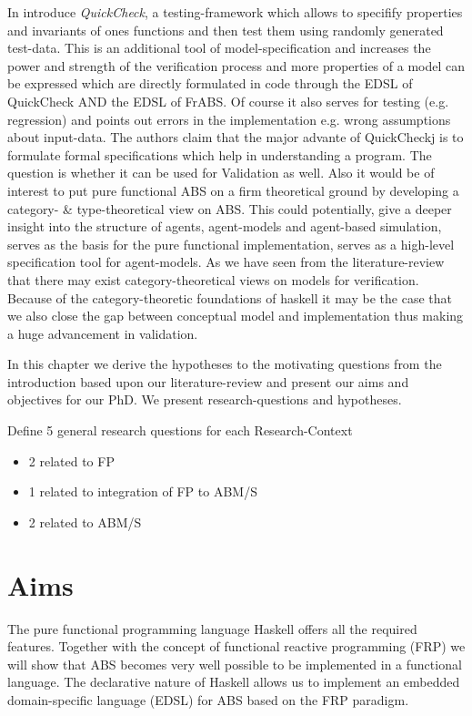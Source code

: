 In \cite{claessen_quickcheck:_2000} introduce \textit{QuickCheck}, a testing-framework which allows to specifify properties and invariants of ones functions and then test them using randomly generated test-data. This is an additional tool of model-specification and increases the power and strength of the verification process and more properties of a model can be expressed which are directly formulated in code through the EDSL of QuickCheck AND the EDSL of FrABS. Of course it also serves for testing (e.g. regression) and points out errors in the implementation e.g. wrong assumptions about input-data. The authors claim that the major advante of QuickCheckj is to formulate formal specifications which help in understanding a program. The question is whether it can be used for Validation as well.
Also it would be of interest to put pure functional ABS on a firm theoretical ground by developing a category- \& type-theoretical view on ABS. This could potentially, give a deeper insight into the structure of agents, agent-models and agent-based simulation, serves as the basis for the pure functional implementation, serves as a high-level specification tool for agent-models.
As we have seen from the literature-review that there may exist category-theoretical views on models for verification. Because of the category-theoretic foundations of haskell it may be the case that we also close the gap between conceptual model and implementation thus making a huge advancement in validation.




In this chapter we derive the hypotheses to the motivating questions from the introduction based upon our literature-review and present our aims and objectives for our PhD. We present research-questions and hypotheses.


Define 5 general research questions for each Research-Context
	\begin{itemize}
    \item 2 related to FP
    \item 1 related to integration of FP to ABM/S
    \item 2 related to ABM/S
    \end{itemize}
    
\section{Aims}
The pure functional programming language Haskell offers all the required features. Together with the concept of functional reactive programming (FRP) we will show that ABS becomes very well possible to be implemented in a functional language. The declarative nature of Haskell allows us to implement an embedded domain-specific language (EDSL) for ABS based on the FRP paradigm.

